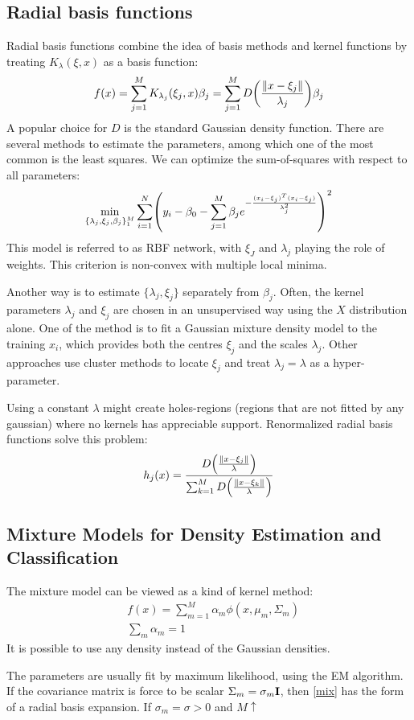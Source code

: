 \subsection{Radial basis functions}
Radial basis functions combine the idea of basis methods and kernel functions by treating $K_\lambda(\xi, x)$ as a basis function:
\begin{equation}
f(x) = \sum_{j=1}^M K_{\lambda_j}(\xi_j,x)\beta_j = \sum_{j=1}^M D\br{\frac{\|x-\xi_j\|}{\lambda_j}}\beta_j
\end{equation}
A popular choice for $D$ is the standard Gaussian density function. There are several methods to estimate the parameters, among which one of the most common is the least squares. We can optimize the sum-of-squares with respect to all parameters:
\begin{equation}
\min_{\{\lambda_j, \xi_j, \beta_j\}_1^M} \sum_{i=1}^N\br{y_i -\beta_0 -\sum_{j=1}^M \beta_j e^{-\frac{(x_i-\xi_j)^T(x_i-\xi_j)}{\lambda_j^2}}}^2
\end{equation}
This model is referred to as RBF network, with $\xi_J$ and $\lambda_j$ playing the role of weights. This criterion is non-convex with multiple local minima.

Another way is to estimate $\{\lambda_j,\xi_j\}$ separately from $\beta_j$. Often, the kernel parameters $\lambda_j$ and $\xi_j$ are chosen in an unsupervised way using the $X$ distribution alone. One of the method is to fit a Gaussian mixture density model  to the training $x_i$, which provides both the centres $\xi_j$ and the scales $\lambda_j$. Other approaches use cluster methods to locate $\xi_j$ and treat $\lambda_j=\lambda$ as a hyper-parameter.

Using a constant $\lambda$ might create holes-regions (regions that are not fitted by any gaussian) where no kernels has appreciable support. Renormalized radial basis functions solve this problem:
\begin{equation}
h_j(x) = \frac{D\br{\frac{\|x-\xi_j\|}{\lambda}}}{\sum_{k=1}^MD\br{\frac{\|x-\xi_k\|}{\lambda}}}
\end{equation}

\subsection{Mixture Models for Density Estimation and Classification}
The mixture model can be viewed as a kind of kernel method:
\begin{equation}
\begin{aligned}
&f(x) = \sum_{m=1}^M \alpha_m \phi(x, \mu_m,\Sigma_m)\\
&\sum_m \alpha_m =1
\end{aligned}
\label{mix}
\end{equation}
It is possible to use any density instead of the Gaussian densities.

The parameters are usually fit by maximum likelihood, using the EM algorithm. If the covariance matrix is force to be scalar $\Sigma_m = \sigma_m \mathrm{\mathbf{I}}$, then \autoref{mix} has the form of a radial basis expansion. If $\sigma_m = \sigma >0$ and $M \uparrow $